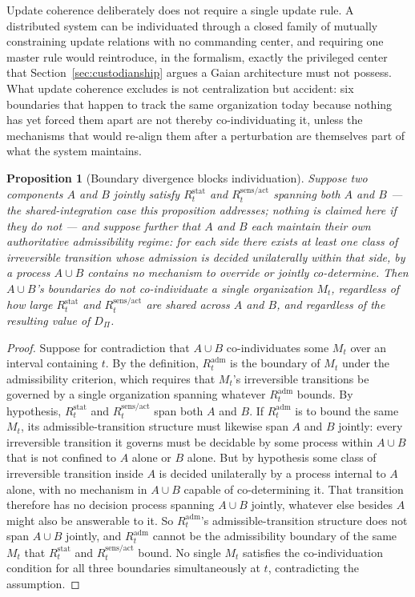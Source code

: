 \documentclass[11pt]{article}
\newtheorem{proposition}{Proposition}
\begin{document}
Update coherence deliberately does not require a single update rule. A distributed system can be individuated through a closed family of mutually constraining update relations with no commanding center, and requiring one master rule would reintroduce, in the formalism, exactly the privileged center that Section~\ref{sec:custodianship} argues a Gaian architecture must not possess. What update coherence excludes is not centralization but accident: six boundaries that happen to track the same organization today because nothing has yet forced them apart are not thereby co-individuating it, unless the mechanisms that would re-align them after a perturbation are themselves part of what the system maintains.

\begin{proposition}[Boundary divergence blocks individuation]
\label{prop:federation}
Suppose two components $A$ and $B$ jointly satisfy $R^{\mathrm{stat}}_t$ and $R^{\mathrm{sens/act}}_t$ spanning both $A$ and $B$ --- the shared-integration case this proposition addresses; nothing is claimed here if they do not --- and suppose further that $A$ and $B$ each maintain their own authoritative admissibility regime: for each side there exists at least one class of irreversible transition whose admission is decided unilaterally within that side, by a process $A\cup B$ contains no mechanism to override or jointly co-determine. Then $A\cup B$'s boundaries do not co-individuate a single organization $M_t$, regardless of how large $R^{\mathrm{stat}}_t$ and $R^{\mathrm{sens/act}}_t$ are shared across $A$ and $B$, and regardless of the resulting value of $D_\Pi$.
\end{proposition}

\begin{proof}
Suppose for contradiction that $A\cup B$ co-individuates some $M_t$ over an interval containing $t$. By the definition, $R^{\mathrm{adm}}_t$ is the boundary of $M_t$ under the admissibility criterion, which requires that $M_t$'s irreversible transitions be governed by a single organization spanning whatever $R^{\mathrm{adm}}_t$ bounds. By hypothesis, $R^{\mathrm{stat}}_t$ and $R^{\mathrm{sens/act}}_t$ span both $A$ and $B$. If $R^{\mathrm{adm}}_t$ is to bound the same $M_t$, its admissible-transition structure must likewise span $A$ and $B$ jointly: every irreversible transition it governs must be decidable by some process within $A\cup B$ that is not confined to $A$ alone or $B$ alone. But by hypothesis some class of irreversible transition inside $A$ is decided unilaterally by a process internal to $A$ alone, with no mechanism in $A\cup B$ capable of co-determining it. That transition therefore has no decision process spanning $A\cup B$ jointly, whatever else besides $A$ might also be answerable to it. So $R^{\mathrm{adm}}_t$'s admissible-transition structure does not span $A\cup B$ jointly, and $R^{\mathrm{adm}}_t$ cannot be the admissibility boundary of the same $M_t$ that $R^{\mathrm{stat}}_t$ and $R^{\mathrm{sens/act}}_t$ bound. No single $M_t$ satisfies the co-individuation condition for all three boundaries simultaneously at $t$, contradicting the assumption.
\end{proof}
\end{document}
